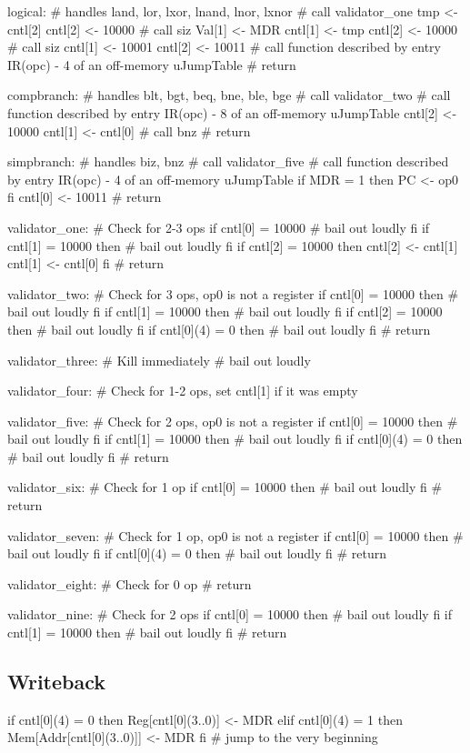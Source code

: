 \documentclass[12pt]{article}
\begin{document}
\begin{verbatimtab}
logical: # handles land, lor, lxor, lnand, lnor, lxnor
	# call validator_one
	tmp <- cntl[2]
	cntl[2] <- 10000
	# call siz
	Val[1] <- MDR
	cntl[1] <- tmp
	cntl[2] <- 10000
	# call siz
	cntl[1] <- 10001
	cntl[2] <- 10011
	# call function described by entry IR(opc) - 4 of an off-memory uJumpTable
	# return

compbranch: # handles blt, bgt, beq, bne, ble, bge
	# call validator_two
	# call function described by entry IR(opc) - 8 of an off-memory uJumpTable
	cntl[2] <- 10000
	cntl[1] <- cntl[0]
	# call bnz
	# return

simpbranch: # handles biz, bnz
	# call validator_five
	# call function described by entry IR(opc) - 4 of an off-memory uJumpTable
	if MDR = 1 then
		PC <- op0
	fi
	cntl[0] <- 10011
	# return

validator_one:
	# Check for 2-3 ops
	if cntl[0] = 10000
		# bail out loudly
	fi
	if cntl[1] = 10000 then
		# bail out loudly
	fi
	if cntl[2] = 10000 then
		cntl[2] <- cntl[1]
		cntl[1] <- cntl[0]
	fi
	# return

validator_two:
	# Check for 3 ops, op0 is not a register
	if cntl[0] = 10000 then
		# bail out loudly
	fi
	if cntl[1] = 10000 then
		# bail out loudly
	fi
	if cntl[2] = 10000 then
		# bail out loudly
	fi
	if cntl[0](4) = 0 then
		# bail out loudly
	fi
	# return

validator_three:
	# Kill immediately
	# bail out loudly

validator_four:
	# Check for 1-2 ops, set cntl[1] if it was empty

validator_five:
	# Check for 2 ops, op0 is not a register
	if cntl[0] = 10000 then
		# bail out loudly
	fi
	if cntl[1] = 10000 then
		# bail out loudly
	fi
	if cntl[0](4) = 0 then
		# bail out loudly
	fi
	# return

validator_six:
	# Check for 1 op
	if cntl[0] = 10000 then
		# bail out loudly
	fi
	# return

validator_seven:
	# Check for 1 op, op0 is not a register
	if cntl[0] = 10000 then
		# bail out loudly
	fi
	if cntl[0](4) = 0 then
		# bail out loudly
	fi
	# return

validator_eight:
	# Check for 0 op
	# return

validator_nine:
	# Check for 2 ops
	if cntl[0] = 10000 then
		# bail out loudly
	fi
	if cntl[1] = 10000 then
		# bail out loudly
	fi
	# return
\end{verbatimtab}

\subsection{Writeback}
\begin{verbatimtab}
if cntl[0](4) = 0 then
	Reg[cntl[0](3..0)] <- MDR
elif cntl[0](4) = 1 then
	Mem[Addr[cntl[0](3..0)]] <- MDR
fi
# jump to the very beginning
\end{verbatimtab}
\end{document}

